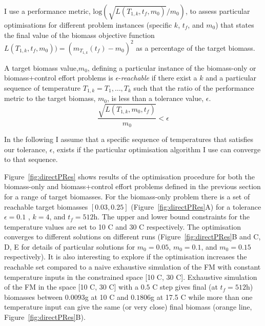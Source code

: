 I use a performance metric, $\mathrm{log}(\sqrt{L(T_{1, k}, t_f, m_0)} / m_0)$,
to assess particular optimisations for different problem instances (specific
$k$, $t_f$, and $m_0$) that states the final value of the biomass objective
function $L(T_{1, k}, t_f, m_0))=(m_{T_{1, k}}(t_f) - m_0)^2$ as a percentage of
the target biomass.

\begin{definition}
  A target biomass value,$m_0$, defining a particular instance of the
  biomass-only or biomass+control effort problems is $\epsilon$-\emph{reachable}
  if there exist a $k$ and a particular sequence of temperature
  $T_{1, k}=T_1, \dots, T_k$ such that the ratio of the performance metric to the
  target biomass, $m_0$, is less than a tolerance value, $\epsilon$.
$$
\frac{\sqrt{L(T_{1, k}, m_0, t_f)}}{m_0} < \epsilon
$$
\end{definition}
In the following I assume that a specific sequence of temperatures that
satisfies our tolerance, $\epsilon$, exists if the particular optimisation
algorithm I use can converge to that sequence.

Figure~\ref{fig:directPRes} shows results of the optimisation procedure for both
the biomass-only and biomass+control effort problems defined in the previous
section for a range of target biomasses. For the biomass-only problem there is a
set of reachable target biomasses $[0.03, 0.25]$ (Figure~\ref{fig:directPRes}A)
for a tolerance $\epsilon=0.1$ , $k=4$, and $t_f=512$h. The upper and lower
bound constraints for the temperature values are set to 10 \textdegree C and 30
\textdegree C respectively. The optimisation converges to different solutions on
different runs (Figure~\ref{fig:directPRes}B and C, D, E for details of
particular solutions for $m_0=0.05$, $m_0=0.1$, and $m_0=0.15$ respectively). It
is also interesting to explore if the optimisation increases the reachable set
compared to a naive exhaustive simulation of the FM with constant temperature
inputs in the constrained space [10 \textdegree C, 30 \textdegree C]. Exhaustive
simulation of the FM in the space [10 \textdegree C, 30 \textdegree C] with a
$0.5$ \textdegree C step gives final (at $t_f=512$h) biomasses between $0.0093$g
at 10 \textdegree C and $0.1806$g at 17.5 \textdegree C while more than one
temperature input can give the same (or very close) final biomass (orange line,
Figure~\ref{fig:directPRes}B).


